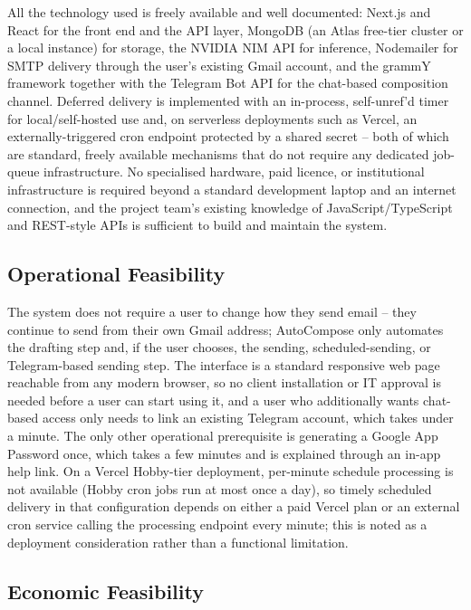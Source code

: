 \documentclass[12pt,a4paper]{article}
\begin{document}
All the technology used is freely available and well documented: Next.js and React for the front end and the API layer, MongoDB (an Atlas free-tier cluster or a local instance) for storage, the NVIDIA NIM API for inference, Nodemailer for SMTP delivery through the user's existing Gmail account, and the grammY framework together with the Telegram Bot API for the chat-based composition channel. Deferred delivery is implemented with an in-process, self-unref'd timer for local/self-hosted use and, on serverless deployments such as Vercel, an externally-triggered cron endpoint protected by a shared secret -- both of which are standard, freely available mechanisms that do not require any dedicated job-queue infrastructure. No specialised hardware, paid licence, or institutional infrastructure is required beyond a standard development laptop and an internet connection, and the project team's existing knowledge of JavaScript/TypeScript and REST-style APIs is sufficient to build and maintain the system.

\subsection{Operational Feasibility}

The system does not require a user to change how they send email -- they continue to send from their own Gmail address; AutoCompose only automates the drafting step and, if the user chooses, the sending, scheduled-sending, or Telegram-based sending step. The interface is a standard responsive web page reachable from any modern browser, so no client installation or IT approval is needed before a user can start using it, and a user who additionally wants chat-based access only needs to link an existing Telegram account, which takes under a minute. The only other operational prerequisite is generating a Google App Password once, which takes a few minutes and is explained through an in-app help link. On a Vercel Hobby-tier deployment, per-minute schedule processing is not available (Hobby cron jobs run at most once a day), so timely scheduled delivery in that configuration depends on either a paid Vercel plan or an external cron service calling the processing endpoint every minute; this is noted as a deployment consideration rather than a functional limitation.

\subsection{Economic Feasibility}
\end{document}
